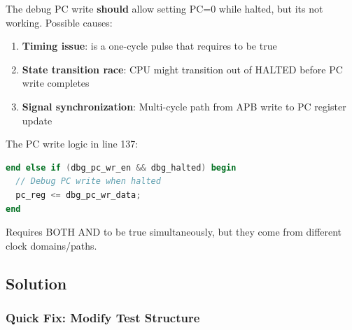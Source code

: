 \begin{record}

The debug PC write \textbf{should} allow setting PC=0 while halted, but
it\textquotesingle s not working. Possible causes:

\begin{enumerate}
\def\labelenumi{\arabic{enumi}.}
\tightlist
\item
  \textbf{Timing issue}:  is a one-cycle pulse that
  requires  to be true
\item
  \textbf{State transition race}: CPU might transition out of HALTED
  before PC write completes
\item
  \textbf{Signal synchronization}: Multi-cycle path from APB write to PC
  register update
\end{enumerate}

The PC write logic in  line 137:

\begin{lstlisting}[language=Verilog]
end else if (dbg_pc_wr_en && dbg_halted) begin
  // Debug PC write when halted
  pc_reg <= dbg_pc_wr_data;
end
\end{lstlisting}

Requires BOTH  AND  to be true
simultaneously, but they come from different clock
domains/\allowbreak{}paths.

\end{record}

\subsection{Solution}\label{cr:fix:rtl-isa-test-fix:solution}

\subsubsection{Quick Fix: Modify Test Structure}\label{cr:fix:rtl-isa-test-fix:quick-fix-modify-test-structure}

